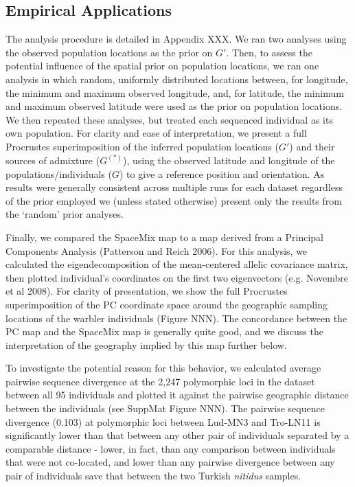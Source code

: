 \documentclass[12pt]{article}
\newcommand{\admixsource}[1]{{$G^{(*)}$}}
\begin{document}
\subsection*{Empirical Applications}
The analysis procedure is detailed in Appendix XXX.  We ran two analyses using the observed population locations as the prior on $G'$.  Then, to assess the potential influence of the spatial prior on population locations, we ran one analysis in which random, uniformly distributed locations between, for longitude, the minimum and maximum observed longitude, and, for latitude, the minimum and maximum observed latitude were used as the prior on population locations.  We then repeated these analyses, but treated each sequenced individual as its own population.  For clarity and ease of interpretation, we present a full Procrustes superimposition of the inferred population locations ($G'$) and their sources of admixture (\admixsource{}), using the observed latitude and longitude of the populations/individuals ($G$) to give a reference position and orientation.  As results were generally consistent across multiple runs for each dataset regardless of the prior employed we (unless stated otherwise) present only the results from the `random' prior analyses.

Finally, we compared the SpaceMix map to a map derived from a Principal Components Analysis (Patterson and Reich 2006).  For this analysis, we calculated the eigendecomposition of the mean-centered allelic covariance matrix, then plotted individual's coordinates on the first two eigenvectors (e.g. Novembre et al 2008).  For clarity of presentation, we show the full Procrustes superimposition of the PC coordinate space around the geographic sampling locations of the warbler individuals (Figure NNN).  The concordance between the PC map and the SpaceMix map is generally quite good, and we discuss the interpretation of the geography implied by this map further below.

To investigate the potential reason for this behavior, we calculated average pairwise sequence divergence at the 2,247 polymorphic loci in the dataset between all 95 individuals and plotted it against the pairwise geographic distance between the individuals (see SuppMat Figure NNN).  The pairwise sequence divergence (0.103) at polymorphic loci between Lud-MN3 and Tro-LN11 is significantly lower than that between any other pair of individuals separated by a comparable distance - lower, in fact, than any comparison between individuals that were not co-located, and lower than any pairwise divergence between any pair of individuals save that between the two Turkish \textit{nitidus} samples. 
\end{document}
